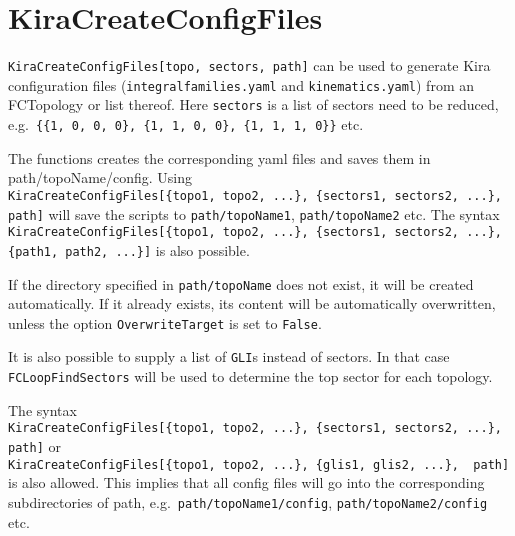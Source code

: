 \documentclass[../FeynHelpersManual.tex]{subfiles}
\begin{document}
\hypertarget{kiracreateconfigfiles}{
\section{KiraCreateConfigFiles}\label{kiracreateconfigfiles}}

\texttt{KiraCreateConfigFiles[\allowbreak{}topo,\ \allowbreak{}sectors,\ \allowbreak{}path]}
can be used to generate Kira configuration files
(\texttt{integralfamilies.yaml} and \texttt{kinematics.yaml}) from an
FCTopology or list thereof. Here \texttt{sectors} is a list of sectors
need to be reduced,
e.g.~\texttt{\{\allowbreak{}\{\allowbreak{}1,\ \allowbreak{}0,\ \allowbreak{}0,\ \allowbreak{}0\},\ \allowbreak{}\{\allowbreak{}1,\ \allowbreak{}1,\ \allowbreak{}0,\ \allowbreak{}0\},\ \allowbreak{}\{\allowbreak{}1,\ \allowbreak{}1,\ \allowbreak{}1,\ \allowbreak{}0\}\}}
etc.

The functions creates the corresponding yaml files and saves them in
path/topoName/config. Using
\texttt{KiraCreateConfigFiles[\allowbreak{}\{\allowbreak{}topo1,\ \allowbreak{}topo2,\ \allowbreak{}...\},\ \allowbreak{}\{\allowbreak{}sectors1,\ \allowbreak{}sectors2,\ \allowbreak{}...\},\ \allowbreak{} path]}
will save the scripts to \texttt{path/topoName1},
\texttt{path/topoName2} etc. The syntax
\texttt{KiraCreateConfigFiles[\allowbreak{}\{\allowbreak{}topo1,\ \allowbreak{}topo2,\ \allowbreak{}...\},\ \allowbreak{}\{\allowbreak{}sectors1,\ \allowbreak{}sectors2,\ \allowbreak{}...\},\ \allowbreak{} \{\allowbreak{}path1,\ \allowbreak{}path2,\ \allowbreak{}...\}]}
is also possible.

If the directory specified in \texttt{path/topoName} does not exist, it
will be created automatically. If it already exists, its content will be
automatically overwritten, unless the option \texttt{OverwriteTarget} is
set to \texttt{False}.

It is also possible to supply a list of \texttt{GLI}s instead of
sectors. In that case \texttt{FCLoopFindSectors} will be used to
determine the top sector for each topology.

The syntax
\texttt{KiraCreateConfigFiles[\allowbreak{}\{\allowbreak{}topo1,\ \allowbreak{}topo2,\ \allowbreak{}...\},\ \allowbreak{}\{\allowbreak{}sectors1,\ \allowbreak{}sectors2,\ \allowbreak{}...\},\ \allowbreak{}path]}
or
\texttt{KiraCreateConfigFiles[\allowbreak{}\{\allowbreak{}topo1,\ \allowbreak{}topo2,\ \allowbreak{}...\},\ \allowbreak{}\{\allowbreak{}glis1,\ \allowbreak{}glis2,\ \allowbreak{}...\},\ \allowbreak{} path]}
is also allowed. This implies that all config files will go into the
corresponding subdirectories of path,
e.g.~\texttt{path/topoName1/config}, \texttt{path/topoName2/config} etc.
\end{document}
